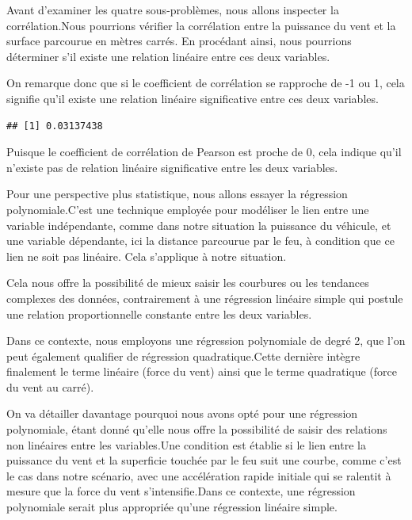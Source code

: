 \documentclass[
]{article}
\newenvironment{Shaded}{\begin{snugshade}}{\end{snugshade}}
\newcommand{\AttributeTok}[1]{\textcolor[rgb]{0.13,0.29,0.53}{#1}}
\newcommand{\FunctionTok}[1]{\textcolor[rgb]{0.13,0.29,0.53}{\textbf{#1}}}
\newcommand{\NormalTok}[1]{#1}
\newcommand{\OtherTok}[1]{\textcolor[rgb]{0.56,0.35,0.01}{#1}}
\newcommand{\SpecialCharTok}[1]{\textcolor[rgb]{0.81,0.36,0.00}{\textbf{#1}}}
\newcommand{\StringTok}[1]{\textcolor[rgb]{0.31,0.60,0.02}{#1}}
\begin{document}
Avant d'examiner les quatre sous-problèmes, nous allons inspecter la
corrélation.Nous pourrions vérifier la corrélation entre la puissance du
vent et la surface parcourue en mètres carrés. En procédant ainsi, nous
pourrions déterminer s'il existe une relation linéaire entre ces deux
variables.

On remarque donc que si le coefficient de corrélation se rapproche de -1
ou 1, cela signifie qu'il existe une relation linéaire significative
entre ces deux variables.

\begin{Shaded}
\end{Shaded}

\begin{verbatim}
## [1] 0.03137438
\end{verbatim}

Puisque le coefficient de corrélation de Pearson est proche de 0, cela
indique qu'il n'existe pas de relation linéaire significative entre les
deux variables.

Pour une perspective plus statistique, nous allons essayer la régression
polynomiale.C'est une technique employée pour modéliser le lien entre
une variable indépendante, comme dans notre situation la puissance du
véhicule, et une variable dépendante, ici la distance parcourue par le
feu, à condition que ce lien ne soit pas linéaire. Cela s'applique à
notre situation.

Cela nous offre la possibilité de mieux saisir les courbures ou les
tendances complexes des données, contrairement à une régression linéaire
simple qui postule une relation proportionnelle constante entre les deux
variables.

Dans ce contexte, nous employons une régression polynomiale de degré 2,
que l'on peut également qualifier de régression quadratique.Cette
dernière intègre finalement le terme linéaire (force du vent) ainsi que
le terme quadratique (force du vent au carré).

On va détailler davantage pourquoi nous avons opté pour une régression
polynomiale, étant donné qu'elle nous offre la possibilité de saisir des
relations non linéaires entre les variables.Une condition est établie si
le lien entre la puissance du vent et la superficie touchée par le feu
suit une courbe, comme c'est le cas dans notre scénario, avec une
accélération rapide initiale qui se ralentit à mesure que la force du
vent s'intensifie.Dans ce contexte, une régression polynomiale serait
plus appropriée qu'une régression linéaire simple.
\end{document}

